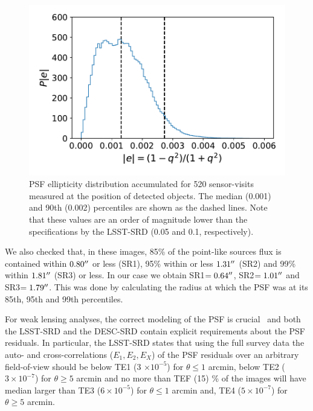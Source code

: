 \documentclass[twocolumn]{aastex62}
\begin{document}
\begin{figure}
\centering
\includegraphics[width=0.9\columnwidth]{PSF_ellipticity_DC1}
\caption{PSF ellipticity distribution accumulated for 520 sensor-visits measured at the position of detected objects. The median (0.001) and 90th (0.002) percentiles are shown as the dashed lines. Note that these values are an order of magnitude lower than the specifications by the LSST-SRD (0.05 and 0.1, respectively).}
\label{fig:SE1_DC1}
\end{figure}

We also checked that, in these images, 85\% of the point-like sources flux is contained within $0.80\mbox{$^{\prime\prime}$}$ or less (SR1), 95\% within or less $1.31\mbox{$^{\prime\prime}$}$ (SR2) and 99\% within $1.81\mbox{$^{\prime\prime}$}$ (SR3) or less. In our case we obtain SR1$=0.64\mbox{$^{\prime\prime}$}$, SR2$=1.01\mbox{$^{\prime\prime}$}$ and SR3$=1.79\mbox{$^{\prime\prime}$}$. This was done by calculating the radius at which the PSF was at its 85th, 95th and 99th percentiles.

For weak lensing analyses, the correct modeling of the PSF is crucial~\citep{2004MNRAS.353..529H} and both the LSST-SRD and the DESC-SRD contain explicit requirements about the PSF residuals. In particular, the LSST-SRD states that using the full survey data the auto- and cross-correlations ($E_{1}, E_{2}, E_{X}$) of the PSF residuals over an arbitrary field-of-view should be below TE1 (3 $\times 10^{-5}$) for $\theta \leq 1$ arcmin, below TE2 ($3 \times 10^{-7}$) for $\theta \geq 5$ arcmin and no more than TEF (15) \% of the images will have median larger than TE3 ($6 \times 10^{-5}$) for $\theta \leq 1$ arcmin and, TE4 ($5 \times 10^{-7}$) for $\theta \geq 5$ arcmin. 
\end{document}
